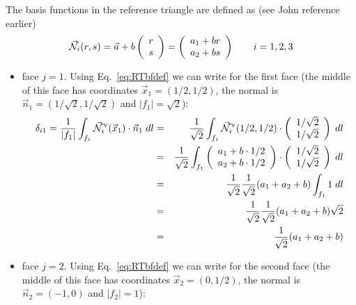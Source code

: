 The basis functions in the reference triangle are defined as (see John reference earlier)
\[
\vec{{\mathcal{N}}}_i(r,s)
=\vec{a} + b  \left(\begin{array}{c} r\\s \end{array}\right)
=\left(\begin{array}{c} a_1+b r \\ a_2 + b s \end{array}\right)
\qquad i=1,2,3
\]

\begin{itemize}
\item face $j=1$. 
Using Eq.~\eqref{eq:RTbfdef} we can write for the first face (the middle of this face has coordinates 
$\vec{x}_1=(1/2,1/2)$, the normal is $\vec{n}_1=(1/\sqrt2,1/\sqrt2)$ and $|f_1|=\sqrt 2$):
\begin{eqnarray}
\delta_{i1}=
\frac{1}{|f_1|} \int_{f_1} \vec{{\mathcal{N}}}^\upnu_i( \vec{x}_1) \cdot \vec{n}_1 \; dl
&=& \frac{1}{\sqrt 2} \int_{f_1} \vec{{\mathcal{N}}}^\upnu_i( 1/2,1/2) \cdot 
\left(\begin{array}{c} 1/\sqrt2 \\1/\sqrt2 \end{array}\right) \; dl \nonumber\\
&=& \frac{1}{\sqrt 2} \int_{f_1} 
\left(\begin{array}{c} a_1+b\cdot 1/2 \\ a_2 + b \cdot 1/2 \end{array}\right)
\cdot 
\left(\begin{array}{c} 1/\sqrt2 \\1/\sqrt2 \end{array}\right) \; dl \nonumber\\
&=& \frac{1}{\sqrt 2} \frac{1}{\sqrt2} (a_1 + a_2+b) \int_{f_1} 1 \; dl \nonumber\\
&=& \frac{1}{\sqrt 2} \frac{1}{\sqrt2} (a_1 + a_2+b) \sqrt 2 \nonumber\\
&=& \frac{1}{\sqrt 2}  (a_1 + a_2+b) \label{eq:RT0tri1}
\end{eqnarray}


\item face $j=2$.
Using Eq.~\eqref{eq:RTbfdef} we can write for the second face (the middle of this face has coordinates $\vec{x}_2=(0,1/2)$, the normal is $\vec{n}_2=(-1,0)$ and $|f_2|=1$):


\end{itemize}
